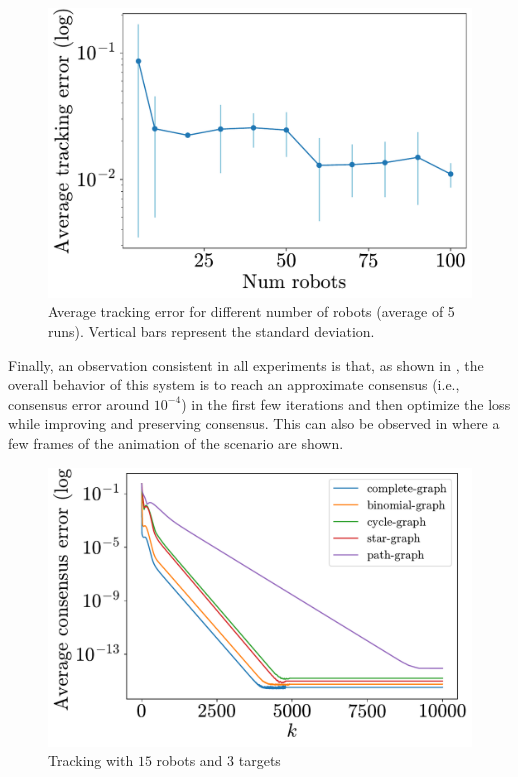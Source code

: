 \documentclass[a4paper,11pt,oneside]{book}
\begin{document}
\begin{figure}[tb!]
      \centering
      \includegraphics[width=0.46\linewidth]{./figs/tracking/average/avg_tracking.pdf}
      \caption{Average tracking error for different number of robots (average of 5 runs). Vertical bars represent the standard deviation.}
      \label{fig:tracking_avg_error_runs}
\end{figure}


Finally, an observation consistent in all experiments is that, as shown in , the overall behavior of this system is to reach an approximate consensus (i.e., consensus error around $10^{-4}$) in the first few iterations and then optimize the loss while improving and preserving consensus. This can also be observed in  where a few frames of the animation of the scenario are shown.

\begin{figure}[tb!]
      \centering
      \includegraphics[width=0.46\linewidth]{./figs/tracking/15_3_2/consensus.pdf} 
      \caption{Tracking with $15$ robots and $3$ targets}
      \label{fig:tracking_consensus}
\end{figure}
\end{document}
